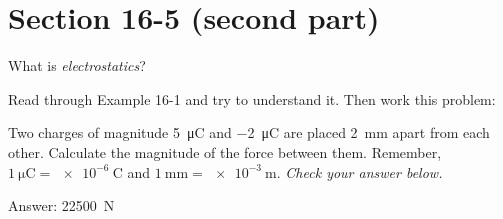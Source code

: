 \documentclass[10pt]{exam}
\begin{document}
\section{Section 16-5 (second part)}

\begin{questions}
  \question
    What is \emph{electrostatics}? \vs

  \question
    Read through Example 16-1 and try to understand it.  Then work this problem:

    Two charges of magnitude \SI{+5}{\micro\coulomb} and \SI{-2}{\micro\coulomb} are placed \SI{2}{\milli\meter} apart from each other.  Calculate the magnitude of the force between them.  Remember, $\SI{1}{\micro\coulomb}=\SI{e-6}{\coulomb}$ and $\SI{1}{\milli\meter}=\SI{e-3}{\meter}$.  \emph{Check your answer below.} \vs[3]

    {\footnotesize Answer: \SI{22500}{\newton}}
    
\end{questions}



    

    

    
\end{document}
